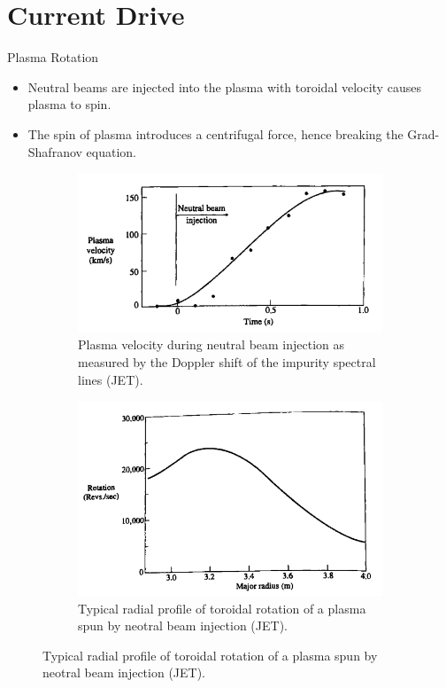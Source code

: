 \section{Current Drive}
\begin{frame} {Plasma Rotation}
    \begin{itemize}
        \item Neutral beams are injected into the plasma with toroidal velocity causes plasma to spin.
        \item The spin of plasma introduces a centrifugal force, hence breaking the Grad-Shafranov equation.
    \end{itemize}
    \begin{figure}
        \centering
        \begin{subfigure}{0.45\textwidth}
            \includegraphics[width=\textwidth]{figures/plasma-velocity.png}
            \caption{Plasma velocity during neutral beam injection as measured by the Doppler shift of the impurity spectral lines (JET).}
        \end{subfigure}%
        \begin{subfigure}{0.45\textwidth}
            \includegraphics[width=\textwidth]{figures/rotation-velocity.png}
            \caption{Typical radial profile of toroidal rotation of a plasma spun by neotral beam injection (JET).}
        \end{subfigure}
        \label{fig:centrifugal-effect}
    \end{figure}
\end{frame}

